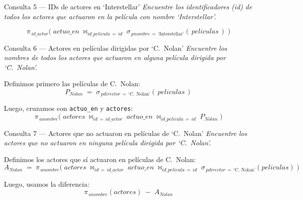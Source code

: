 \documentclass[12pt,a4paper]{article}
\begin{document}
\vspace{0.4cm}

\begin{querybox}{Consulta 5 --- IDs de actores en `Interstellar'}
\textit{Encuentre los identificadores (\textnormal{id}) de todos los
actores que actuaron en la película con nombre \textnormal{`Interstellar'}.}

\[
  \pi_{\,id\_actor}\!\Big(\;
    actuo\_en
    \;\bowtie_{id\_pelicula\,=\,id}\;
    \sigma_{\,pnombre\,=\,\text{`Interstellar'}}\!\left(\, peliculas \,\right)
  \;\Big)
\]
\end{querybox}

\vspace{0.4cm}

\begin{querybox}{Consulta 6 --- Actores en películas dirigidas por `C.\ Nolan'}
\textit{Encuentre los nombres de todos los actores que actuaron en alguna
película dirigida por \textnormal{`C.~Nolan'}.}

Definimos primero las películas de C.\ Nolan:
\[
  P_{Nolan} \;=\;
    \sigma_{\,pdirector\,=\,\text{`C.\ Nolan'}}\!\left(\, peliculas \,\right)
\]

Luego, cruzamos con \texttt{actuo\_en} y \texttt{actores}:
\[
  \pi_{\,anombre}\!\Big(\;
    actores
    \;\bowtie_{id\,=\,id\_actor}\;
    actuo\_en
    \;\bowtie_{id\_pelicula\,=\,id}\;
    P_{Nolan}
  \;\Big)
\]
\end{querybox}

\vspace{0.4cm}

\begin{querybox}{Consulta 7 --- Actores que no actuaron en películas de `C.\ Nolan'}
\textit{Encuentre los actores que no actuaron en ninguna película dirigida
por \textnormal{`C.~Nolan'}.}

Definimos los actores que sí actuaron en películas de C.\ Nolan:
\[
  A_{Nolan} \;=\;
    \pi_{\,anombre}\!\Big(\;
      actores
      \;\bowtie_{id\,=\,id\_actor}\;
      actuo\_en
      \;\bowtie_{id\_pelicula\,=\,id}\;
      \sigma_{\,pdirector\,=\,\text{`C.\ Nolan'}}\!(peliculas)
    \;\Big)
\]

Luego, usamos la diferencia:
\[
  \pi_{\,anombre}\!(actores) \;-\; A_{Nolan}
\]
\end{querybox}
\end{document}
